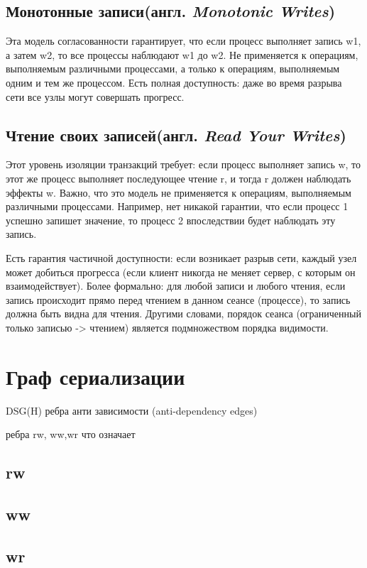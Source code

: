 \documentclass[12pt,  openany]{book}
\begin{document}
\subsection{Монотонные записи(англ.  \textit{Monotonic Writes})}
Эта модель согласованности гарантирует, что если процесс выполняет запись w1,  а затем w2, то все процессы наблюдают w1 до w2. Не применяется к операциям, выполняемым различными процессами, а только к  операциям, выполняемым одним и тем же процессом.
Есть полная доступность: даже во время разрыва сети все узлы могут совершать прогресс.

\subsection{Чтение своих записей(англ.  \textit{Read Your Writes})}
Этот уровень изоляции транзакций требует: если процесс выполняет запись w, то этот же процесс выполняет последующее чтение r, и тогда r должен наблюдать эффекты w.
Важно, что это модель не применяется к операциям, выполняемым различными процессами. Например, нет никакой гарантии, что если процесс 1 успешно запишет значение, то процесс 2 впоследствии будет наблюдать эту запись.
\par
Есть гарантия частичной доступности: если возникает разрыв сети, каждый узел может добиться прогресса (если клиент никогда не меняет сервер, с которым он взаимодействует).
Более формально: для любой записи и любого чтения, если запись происходит прямо перед чтением в данном сеансе (процессе), то запись должна быть видна для чтения. Другими словами, порядок сеанса (ограниченный только записью -> чтением) является подмножеством порядка видимости.

\section{Граф сериализации}
DSG(H)
\newline
ребра анти зависимости (anti-dependency edges)

ребра rw, ww,wr что означает
\subsection{rw}
\subsection{ww}
\subsection{wr}
\end{document}
